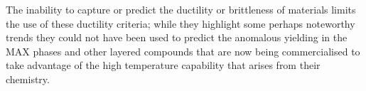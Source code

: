 The inability to capture or predict the ductility or brittleness of materials limits the use of these ductility criteria; while they highlight some perhaps noteworthy trends they could not have been used to predict the anomalous yielding in the MAX phases and other layered compounds that are now being commercialised to take advantage of the high temperature capability that arises from their chemistry.




























































